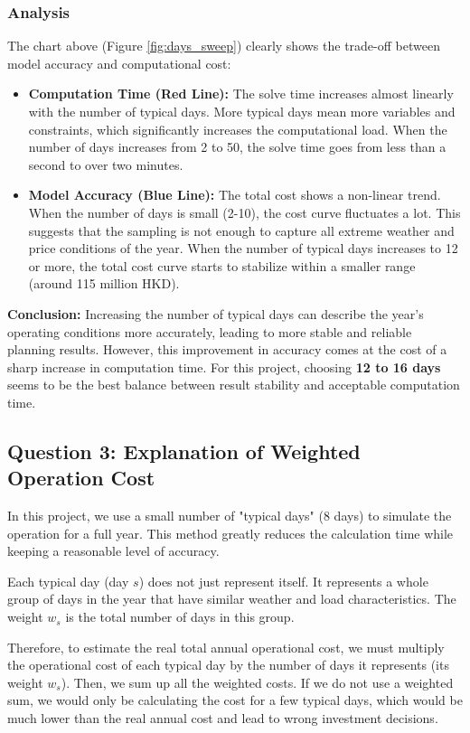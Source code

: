\documentclass[12pt, a4paper]{article}
\begin{document}
\subsubsection*{Analysis}
The chart above (Figure \ref{fig:days_sweep}) clearly shows the trade-off between model accuracy and computational cost:
\begin{itemize}
	\item \textbf{Computation Time (Red Line):} The solve time increases almost linearly with the number of typical days. More typical days mean more variables and constraints, which significantly increases the computational load. When the number of days increases from 2 to 50, the solve time goes from less than a second to over two minutes.
	\item \textbf{Model Accuracy (Blue Line):} The total cost shows a non-linear trend. When the number of days is small (2-10), the cost curve fluctuates a lot. This suggests that the sampling is not enough to capture all extreme weather and price conditions of the year. When the number of typical days increases to 12 or more, the total cost curve starts to stabilize within a smaller range (around 115 million HKD).
\end{itemize}
\textbf{Conclusion:} Increasing the number of typical days can describe the year's operating conditions more accurately, leading to more stable and reliable planning results. However, this improvement in accuracy comes at the cost of a sharp increase in computation time. For this project, choosing \textbf{12 to 16 days} seems to be the best balance between result stability and acceptable computation time.

\subsection{Question 3: Explanation of Weighted Operation Cost}
In this project, we use a small number of "typical days" (8 days) to simulate the operation for a full year. This method greatly reduces the calculation time while keeping a reasonable level of accuracy.

Each typical day (day $s$) does not just represent itself. It represents a whole group of days in the year that have similar weather and load characteristics. The weight $w_s$ is the total number of days in this group.

Therefore, to estimate the real total annual operational cost, we must multiply the operational cost of each typical day by the number of days it represents (its weight $w_s$). Then, we sum up all the weighted costs. If we do not use a weighted sum, we would only be calculating the cost for a few typical days, which would be much lower than the real annual cost and lead to wrong investment decisions.
\end{document}
